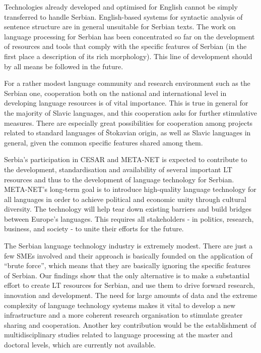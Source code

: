 \begin{multicols}{2}
Technologies already developed and optimised for English cannot be simply transferred to handle Serbian. English-based systems for syntactic analysis of sentence structure are in general unsuitable for Serbian texts. The work on language processing for Serbian has been concentrated so far on the development of resources and tools that comply with the specific features of Serbian (in the first place a description of its rich morphology). This line of development should by all means be followed in the future. 

For a rather modest language community and research environment such as the Serbian one, cooperation both on the national and international level in developing language resources is of vital importance. This is true in general for the majority of Slavic languages, and this cooperation asks for further stimulative measures. There are especially great possibilities for cooperation among projects related to standard languages of Štokavian origin, as well as Slavic languages in general, given the common specific features shared among them. 

Serbia’s participation in CESAR and META-NET is expected to contribute to the development, standardisation and availability of several important LT resources and thus to the development of language technology for Serbian. META-NET’s long-term goal is to introduce high-quality language technology for all languages in order to achieve political and economic unity through cultural diversity. The technology will help tear down existing barriers and build bridges between Europe’s languages. This requires all stakeholders - in politics, research, business, and society - to unite their efforts for the future.

The Serbian language technology industry is extremely modest. There are just a few SMEs involved and their approach is basically founded on the application of “brute force”, which means that they are basically ignoring the specific features of Serbian. Our findings show that the only alternative is to make a substantial effort to create LT resources for Serbian, and use them to drive forward research, innovation and development. The need for large amounts of data and the extreme complexity of language technology systems makes it vital to develop a new infrastructure and a more coherent research organisation to stimulate greater sharing and cooperation. Another key contribution would be the establishment of multidisciplinary studies related to language processing at the master and doctoral levels, which are currently not available.


\end{multicols}
